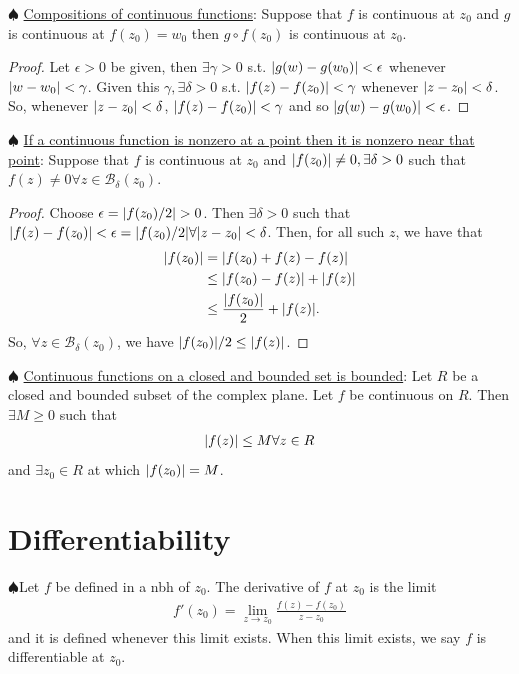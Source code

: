 \documentclass{article}
\theoremstyle{definition}
\newcommand{\f}[2]{\frac{#1}{#2}}
\newcommand{\B}{\mathcal{B}}
\newcommand{\nn}{\nonumber}
\begin{document}
\noindent $\spadesuit$ \underline{Compositions of continuous functions}: Suppose that $f$ is continuous at $z_0$ and $g$ is continuous at $f(z_0) = w_0$ then $g\circ f(z_0)$ is continuous at $z_0$. 

\begin{proof}
	Let $\epsilon > 0$ be given, then $\exists \gamma > 0$ s.t. $\abs{g(w) - g(w_0)} < \epsilon  $ whenever $\abs{w - w_0} < \gamma$. Given this $\gamma, \exists \delta > 0$ s.t. $\abs{f(z) - f(z_0)} < \gamma$ whenever $\abs{z -z_0} < \delta$. So, whenever $\abs{z - z_0} < \delta$,  $\abs{f(z) - f(z_0)} < \gamma$ and so $\abs{g(w) - g(w_0)} < \epsilon$. 
\end{proof}


\noindent $\spadesuit$ \underline{If a continuous function is nonzero at a point then it is nonzero near that point}: Suppose that $f$ is continuous at $z_0$ and $\abs{f(z_0)} \neq 0, \exists \delta > 0$ such that $f(z) \neq 0 \forall z \in \B_\delta(z_0)$.


\begin{proof}
	Choose $\epsilon = \abs{f(z_0)/2} > 0$. Then $\exists \delta > 0$ such that $\abs{f(z) - f(z_0)} < \epsilon = \abs{f(z_0)/2} \forall \abs{z - z_0 } < \delta$. Then, for  all such $z$, we have that
	\begin{align}
	\abs{f(z_0)} &= \abs{f(z_0) + f(z) - f(z)} \nn\\
	&\leq \abs{f(z_0) - f(z)} + \abs{f(z)}\nn\\
	&\leq \f{\abs{f(z_0)}}{2} + \abs{f(z)}.
	\end{align}
	So, $\forall z\in \B_\delta(z_0)$, we have $\abs{f(z_0)}/2 \leq \abs{f(z)}$. 
\end{proof}




\noindent $\spadesuit$ \underline{Continuous functions on a closed and bounded set is bounded}: Let $R$ be a closed and bounded subset of the complex plane. Let $f$ be continuous on $R$. Then $\exists M \geq 0$ such that
\begin{align}
\abs{f(z) } \leq M \forall z \in R
\end{align}
and $\exists z_0 \in R$ at which $\abs{f(z_0)} = M$. 



\section{Differentiability}


\noindent $\spadesuit$Let $f$ be defined in a nbh of $z_0$. The derivative of $f$ at $z_0$ is the limit
\begin{align}
f'(z_0) = \lim_{z \to z_0}\f{f(z) - f(z_0)}{z - z_0}
\end{align}
and it is defined whenever this limit exists. When this limit exists, we say $f$ is differentiable at $z_0$.\\
\end{document}
